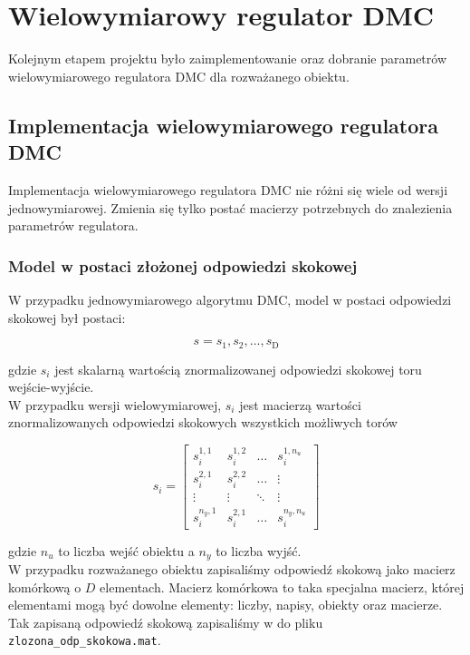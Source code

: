 \chapter{Wielowymiarowy regulator DMC}
\label{pro_dmc}

Kolejnym etapem projektu było zaimplementowanie oraz dobranie parametrów
wielowymiarowego regulatora DMC dla rozważanego obiektu.


\section{Implementacja wielowymiarowego regulatora DMC}
\label{pro_dmc_implementacja}
Implementacja wielowymiarowego regulatora DMC nie różni się wiele od wersji
jednowymiarowej. Zmienia się tylko postać macierzy potrzebnych do
znalezienia parametrów regulatora. 

\subsection{Model w postaci złożonej odpowiedzi skokowej}
\label{pro_dmc_impl_odp_skok}
W przypadku jednowymiarowego algorytmu DMC, model w postaci odpowiedzi skokowej
był postaci:

\begin{equation*}
    s = s_{\mathrm{1}}, s_{\mathrm{2}}, \hdots, s_{\mathrm{D}}
\end{equation*}

gdzie $s_{i}$ jest skalarną wartością znormalizowanej odpowiedzi skokowej toru
wejście-wyjście.\\

W przypadku wersji wielowymiarowej, $s_{i}$ jest macierzą wartości znormalizowanych
odpowiedzi skokowych wszystkich możliwych torów

\[
s_{i} =
\begin{bmatrix}
    s_{i}^{1,1} & s_{i}^{1,2} & \hdots & s_{i}^{1,n_{u}} \\
    s_{i}^{2,1} & s_{i}^{2,2} & \hdots & \vdots \\
    \vdots & \vdots & \ddots & \vdots \\
    s_{i}^{n_{y},1} & s_{i}^{2,1} & \hdots & s_{i}^{n_{y},n_{u}} 
\end{bmatrix}
\]

gdzie $n_{u}$ to liczba wejść obiektu a $n_{y}$ to liczba wyjść.\\

W przypadku rozważanego obiektu zapisaliśmy odpowiedź skokową jako 
macierz komórkową o $D$ elementach. Macierz komórkowa
to taka specjalna macierz, której elementami mogą być dowolne elementy:
liczby, napisy, obiekty oraz macierze. Tak zapisaną odpowiedź skokową zapisaliśmy
w do pliku \verb+zlozona_odp_skokowa.mat+.

